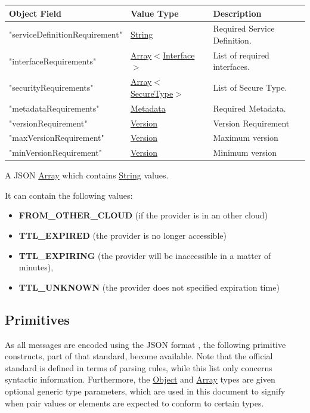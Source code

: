 \documentclass[a4paper]{arrowhead}
\newcommand{\mref}[1]{{\textcolor{ArrowheadPurple}{\hyperref[sec:model:#1]{#1}}}}
\newcommand{\pref}[1]{{\textcolor{ArrowheadGrey}{\hyperref[sec:model:primitives:#1]{#1}}}}
\begin{document}
\begin{table}[ht!]
\begin{tabularx}{\textwidth}{| p{5cm} | p{6cm} | X |} \hline
\rowcolor{gray!33} Object Field & Value Type                      & Description \\ \hline
"serviceDefinitionRequirement"         & \pref{String}     & Required Service Definition. \\ \hline
"interfaceRequirements"            & \pref{Array}$<$\mref{Interface}$>$   & List of required interfaces. \\ \hline
"securityRequirements"               & \pref{Array}$<$\mref{SecureType}$>$     & List of Secure Type. \\ \hline
"metadataRequirements" & \pref{Metadata}   & Required Metadata. \\ \hline
"versionRequirement"   & \pref{Version} & Version Requirement \\ \hline
"maxVersionRequirement" & \pref{Version} & Maximum version \\ \hline
"minVersionRequirement" & \pref{Version} & Minimum version \\ \hline


\end{tabularx}
\end{table}



A JSON \pref{Array} which contains \pref{String} values.

It can contain the following values:
\begin{itemize}
    \item \textbf{FROM\_OTHER\_CLOUD} (if the provider is in an other cloud)
    \item \textbf{TTL\_EXPIRED} (the provider is no longer accessible)
\item \textbf{TTL\_EXPIRING} (the provider will be inaccessible in a matter of minutes),
\item \textbf{TTL\_UNKNOWN} (the provider does not specified expiration time)
\end{itemize}

\subsection{Primitives}
\label{sec:model:primitives}

As all messages are encoded using the JSON format \cite{bray2014json}, the following primitive constructs, part of that standard, become available.
Note that the official standard is defined in terms of parsing rules, while this list only concerns syntactic information.
Furthermore, the \pref{Object} and \pref{Array} types are given optional generic type parameters, which are used in this document to signify when pair values or elements are expected to conform to certain types. 
\end{document}
